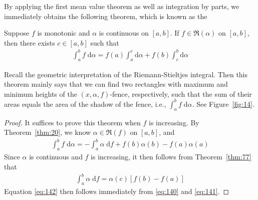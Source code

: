 \documentclass[thmcnt=section, 12pt]{my-elegantbook}
\begin{document}

By applying the first mean value theorem
as well as integration by parts,
we immediately obtains the following theorem,
which is known as 
the 

\begin{theorem} \label{thm:78}
	Suppose $f$ is monotonic and $\alpha$ is continuous on $[a, b]$.
	If $f \in \mathfrak{R}(\alpha)$ on $[a, b]$, 
	then there exists $c \in [a, b]$ such that 
	\begin{align}
		\int_a^b f \; \mathrm{d}\alpha
		= f(a) \int_a^c \mathrm{d} \alpha
			+ f(b) \int_c^b \mathrm{d} \alpha
		\label{eq:142}
	\end{align}
\end{theorem}

Recall the geometric interpretation of the 
Riemann-Stieltjes integral.
Then this theorem mainly says that
we can find two rectangles 
with maximum and minimum heights of the $(x,\alpha,f)$-fence, 
respectively,
such that the sum of their areas
equals the area of the shadow of the fence, i.e., 
$\int_a^b f \; \mathrm{d} \alpha$.
See Figure~\ref{fig:14}.

\begin{proof}
	It suffices to prove this theorem when $f$ is increasing.
	By Theorem~\ref{thm:20}, we know $\alpha \in \mathfrak{R}(f)$ 
	on $[a, b]$, and 
	\begin{align}
		\int_a^b f \; \mathrm{d} \alpha 
		= -\int_a^b \alpha \; \mathrm{d} f
		+ f(b) \alpha(b) - f(a) \alpha(a)
		\label{eq:140}
	\end{align}
	Since $\alpha$ is continuous and $f$ is increasing, 
	it then follows from Theorem~\ref{thm:77} that 
	\begin{align}
		\int_a^b \alpha \; \mathrm{d} f
		= \alpha(c) [f(b) - f(a)]
		\label{eq:141}
	\end{align}
	Equation \eqref{eq:142} then follows immediately from \eqref{eq:140}
	and \eqref{eq:141}.
\end{proof}
\end{document}
